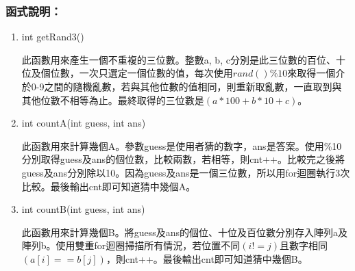 \subsubsection{函式說明：}
\begin{enumerate}
	\item int getRand3()
	
	此函數用來產生一個不重複的三位數。整數a, b, c分別是此三位數的百位、十位及個位數，一次只選定一個位數的值，每次使用$rand()\%10$來取得一個介於0-9之間的隨機亂數，若與其他位數的值相同，則重新取亂數，一直取到與其他位數不相等為止。最終取得的三位數是$(a*100+b*10+c)$。
	
	\item int countA(int guess, int ans)
	
	此函數用來計算幾個A。參數guess是使用者猜的數字，ans是答案。使用\%10分別取得guess及ans的個位數，比較兩數，若相等，則cnt++。比較完之後將guess及ans分別除以10。因為guess及ans是一個三位數，所以用for迴圈執行3次比較。最後輸出cnt即可知道猜中幾個A。
	
	\item int countB(int guess, int ans)
	
	此函數用來計算幾個B。將guess及ans的個位、十位及百位數分別存入陣列a及陣列b。使用雙重for迴圈掃描所有情況，若位置不同$(i != j)$且數字相同$(a[i] == b[j])$，則cnt++。最後輸出cnt即可知道猜中幾個B。
\end{enumerate}


